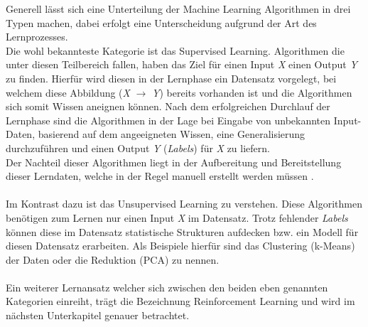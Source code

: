 Generell lässt sich eine Unterteilung der Machine Learning Algorithmen in drei Typen machen, dabei erfolgt eine Unterscheidung aufgrund der Art des Lernprozesses. \\
Die wohl bekannteste Kategorie ist das Supervised Learning. Algorithmen die unter diesen Teilbereich fallen, haben das Ziel für einen Input \textit{X} einen Output \textit{Y} zu finden. Hierfür wird diesen in der Lernphase ein Datensatz vorgelegt, bei welchem diese Abbildung (\textit{X} $\rightarrow$ \textit{Y}) bereits vorhanden ist und die Algorithmen sich somit Wissen aneignen können. Nach dem erfolgreichen Durchlauf der Lernphase sind die Algorithmen in der Lage bei Eingabe von unbekannten Input-Daten, basierend auf dem angeeigneten Wissen, eine Generalisierung durchzuführen und einen Output \textit{Y} (\textit{Labels}) für \textit{X} zu liefern. \\
Der Nachteil dieser Algorithmen liegt in der Aufbereitung und Bereitstellung dieser Lerndaten, welche in der Regel manuell erstellt werden müssen \cite{Engemann}.\\\\
Im Kontrast dazu ist das Unsupervised Learning zu verstehen. Diese Algorithmen benötigen zum Lernen nur einen Input \textit{X} im Datensatz. Trotz fehlender \textit{Labels} können diese im Datensatz statistische Strukturen aufdecken bzw. ein Modell für diesen Datensatz erarbeiten. Als Beispiele hierfür sind das Clustering (k-Means) der Daten oder die Reduktion (PCA) zu nennen. \cite{Engemann,mlmitchel, Sutton}\\\\
Ein weiterer Lernansatz welcher sich zwischen den beiden eben genannten Kategorien einreiht, trägt die Bezeichnung Reinforcement Learning und wird im nächsten Unterkapitel genauer betrachtet.

